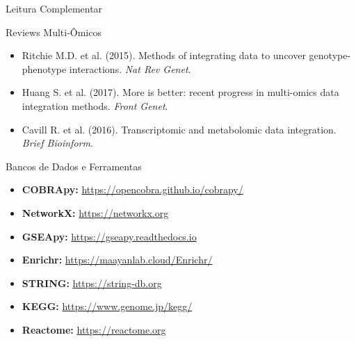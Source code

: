 \begin{frame}{Leitura Complementar}
\begin{block}{Reviews Multi-Ômicos}
\begin{itemize}
    \item Ritchie M.D. et al. (2015). Methods of integrating data to uncover genotype-phenotype interactions. \textit{Nat Rev Genet}.
    \item Huang S. et al. (2017). More is better: recent progress in multi-omics data integration methods. \textit{Front Genet}.
    \item Cavill R. et al. (2016). Transcriptomic and metabolomic data integration. \textit{Brief Bioinform}.
\end{itemize}
\end{block}

\begin{block}{Bancos de Dados e Ferramentas}
\begin{itemize}
    \item \textbf{COBRApy:} \url{https://opencobra.github.io/cobrapy/}
    \item \textbf{NetworkX:} \url{https://networkx.org}
    \item \textbf{GSEApy:} \url{https://gseapy.readthedocs.io}
    \item \textbf{Enrichr:} \url{https://maayanlab.cloud/Enrichr/}
    \item \textbf{STRING:} \url{https://string-db.org}
    \item \textbf{KEGG:} \url{https://www.genome.jp/kegg/}
    \item \textbf{Reactome:} \url{https://reactome.org}
\end{itemize}
\end{block}
\end{frame}

